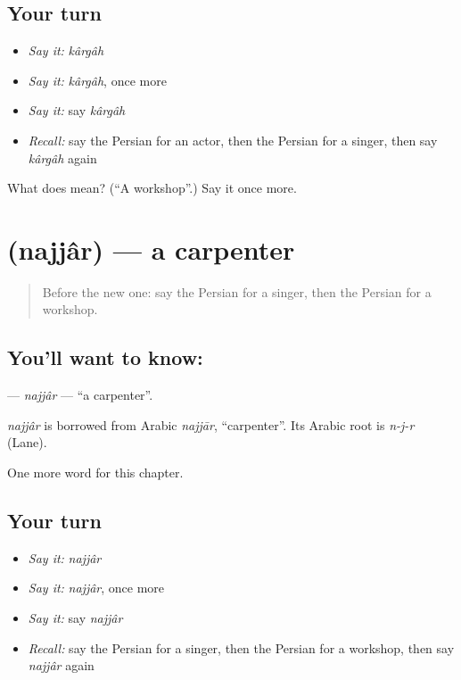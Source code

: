 \subsection*{Your turn}
\begin{itemize}
\raggedright
  \item \emph{Say it:} \emph{kârgâh}
  \item \emph{Say it:} \emph{kârgâh}, once more
  \item \emph{Say it:} say \emph{kârgâh}
  \item \emph{Recall:} say the Persian for an actor, then the Persian for a singer, then say \emph{kârgâh} again
\end{itemize}

\begin{tcolorbox}[breakable,colback=teal!4,colframe=teal!35!black,title={Before you move on}]
What does  mean? (\textquotedblleft{}A workshop\textquotedblright{}.) Say it once more.
\end{tcolorbox}
\section[\texorpdfstring{\fa{نجار} (najjâr)}{نجار (najjâr)}]{ (najjâr) — a carpenter}

\label{lesson:FA-C216-najjar}



\begin{quote}
Before the new one: say the Persian for a singer, then the Persian for a workshop.
\end{quote}

\subsection*{You'll want to know: }
\textbf{} — \emph{najjâr} — \textquotedblleft{}a carpenter\textquotedblright{}.

\begin{cousinweb}
\emph{najjâr} is borrowed from Arabic \emph{najjār}, \textquotedblleft{}carpenter\textquotedblright{}. Its Arabic root is \emph{n-j-r} (Lane).
\end{cousinweb}

\begin{grammarlens}[title={What you've built}]
One more word for this chapter.
\end{grammarlens}

\subsection*{Your turn}
\begin{itemize}
\raggedright
  \item \emph{Say it:} \emph{najjâr}
  \item \emph{Say it:} \emph{najjâr}, once more
  \item \emph{Say it:} say \emph{najjâr}
  \item \emph{Recall:} say the Persian for a singer, then the Persian for a workshop, then say \emph{najjâr} again
\end{itemize}

